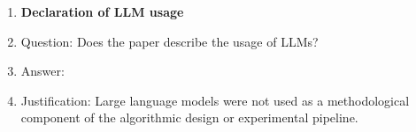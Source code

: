 \begin{enumerate}
\item {\bf Declaration of LLM usage}
    \item[] Question: Does the paper describe the usage of LLMs?
    \item[] Answer: \answerNA{}
    \item[] Justification: Large language models were not used as a methodological component of the algorithmic design or experimental pipeline.

\end{enumerate}
